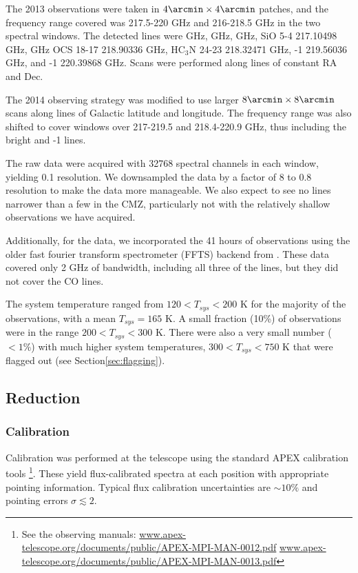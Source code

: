 The 2013 observations were taken in $4\arcmin \times 4\arcmin$ patches, and the
frequency range covered was 217.5-220 GHz and 216-218.5 GHz in the two spectral
windows.  The detected lines were \para {} GHz, \para
{} GHz, \para {} GHz, SiO 5-4 217.10498
GHz, \methanol {} GHz OCS 18-17 218.90336 GHz, HC$_3$N 24-23
218.32471 GHz, -1 219.56036 GHz, and -1 220.39868
GHz.  Scans were performed along lines of constant RA and Dec.

The 2014 observing strategy was modified to use larger $8\arcmin \times
8\arcmin$ scans along lines of Galactic latitude and longitude.  The frequency
range was also shifted to cover windows over 217-219.5 and 218.4-220.9 GHz, thus
including the bright \thirteenco and -1 lines.


The raw data were acquired with 32768 spectral channels in each window, yielding
0.1 \kms resolution.  We downsampled the data by a factor of 8 to 0.8 \kms
resolution to make the data more manageable.  We also expect to see no lines
narrower than a few \kms in the CMZ, particularly not with the relatively
shallow observations we have acquired.

Additionally, for the \para data, we incorporated the 41 hours of observations
using the older fast fourier transform spectrometer (FFTS) backend from
\citet{Ao2013a}.  These data covered only 2
GHz of bandwidth, including all three of the \para lines, but they did not
cover the CO lines.

The system temperature ranged from $120 < T_{sys} < 200$ K for the majority of
the observations, with a mean $T_{sys}=165$ K.  A small fraction (10\%) of
observations were in the range $200 < T_{sys} < 300$ K.  There were also a very
small number ($<1\%$) with much higher system temperatures, $300 < T_{sys} <
750$ K that were flagged out (see Section\ref{sec:flagging}).

\subsection{Reduction}
\subsubsection{Calibration}
Calibration was performed at the telescope using the standard APEX calibration
tools
\footnote{See the observing manuals:
\url{www.apex-telescope.org/documents/public/APEX-MPI-MAN-0012.pdf}
\url{www.apex-telescope.org/documents/public/APEX-MPI-MAN-0013.pdf} }.
These yield flux-calibrated spectra at each position with appropriate pointing
information.  Typical flux calibration uncertainties are $\sim10\%$ and
pointing errors $\sigma\lesssim2$\arcsec. %

